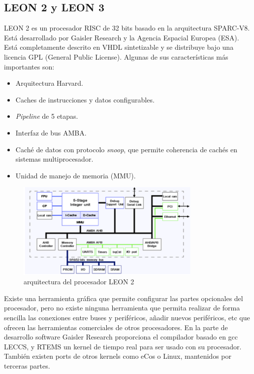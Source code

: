    	\subsection{LEON 2 y LEON 3}

LEON 2 es un procesador RISC de 32 bits basado en la arquitectura SPARC-V8\cite{Etiqueta33}. Está desarrollado por Gaisler Research y la Agencia Espacial Europea (ESA). Está completamente descrito en VHDL sintetizable y se distribuye bajo una licencia GPL (General Public License). Algunas de sus características más importantes son:

\begin{itemize}
		 \item  Arquitectura Harvard.
		 \item  Caches de instrucciones y datos configurables.
	       \item \textit{Pipeline} de 5 etapas.
		 \item  Interfaz de bus AMBA.
 		\item  Caché de datos con protocolo \textit{snoop}, que permite coherencia de cachés en sistemas multiprocesador.
		\item Unidad de manejo de memoria (MMU).
		\end{itemize}
	
\begin{figure}[h!]
 	\begin{center}
  	\includegraphics[width=0.8\textwidth,keepaspectratio=true]{./images/leon}
  	\caption{arquitectura del procesador LEON 2}
 	\end{center}
	\end{figure}

Existe una herramienta gráfica que permite configurar las partes opcionales del procesador, pero no existe ninguna herramienta que permita realizar de forma sencilla las conexiones entre buses y periféricos, añadir nuevos periféricos, etc que ofrecen las herramientas comerciales de otros procesadores. En la parte de desarrollo software Gaisler Research proporciona el compilador basado en gcc LECCS, y RTEMS un kernel de tiempo real para ser usado con su procesador. También existen ports de otros kernels como eCos o Linux, mantenidos por terceras partes.

